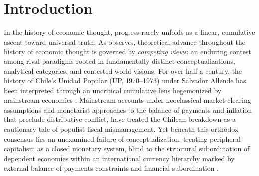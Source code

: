 \section{Introduction}
\label{sec:introduction}

In the history of economic thought, progress rarely unfolds as a linear, cumulative ascent toward universal truth. As \citet{Roncaglia2006} observes, theoretical advance throughout the history of economic thought is governed by \textit{competing views}: an enduring contest among rival paradigms rooted in fundamentally distinct conceptualizations, analytical categories, and contested world visions. For over half a century, the history of Chile's Unidad Popular (UP, 1970--1973) under Salvador Allende has been interpreted through an uncritical cumulative lens hegemonized by mainstream economics \citep{LarrainMeller1991,Edwards2024}. Mainstream accounts under neoclassical market-clearing assumptions and monetarist approaches to the balance of payments and inflation that preclude distributive conflict, have treated the Chilean breakdown as a cautionary tale of populist fiscal mismanagement. Yet beneath this orthodox consensus lies an unexamined failure of conceptualization: treating peripheral capitalism as a closed monetary system, blind to the structural subordination of dependent economies within an international currency hierarchy marked by external balance-of-payments constraints and financial subordination \citep{Jessop2019,Chamorro2025}.

